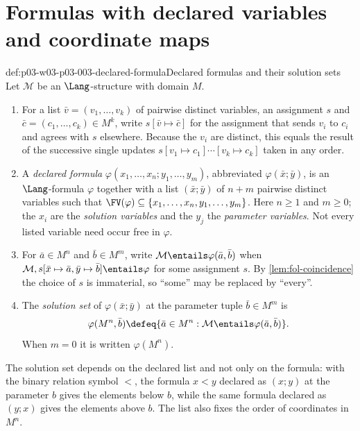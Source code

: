 \section{Formulas with declared variables and coordinate maps}
\label{sec:p03-w03-p03-003-declared}

\begin{hbconvention}{def:p03-w03-p03-003-declared-formula}{Declared formulas and their solution sets}
Let \(\mathcal M\) be an \(\Lang\)-structure with domain \(M\).
\begin{enumerate}
 \item For a list \(\bar v=(v_1,\ldots,v_k)\) of pairwise distinct variables,
       an assignment \(s\) and \(\bar c=(c_1,\ldots,c_k)\in M^k\), write
       \(s[\bar v\mapsto\bar c]\) for the assignment that sends \(v_i\) to
       \(c_i\) and agrees with \(s\) elsewhere.  Because the \(v_i\) are
       distinct, this equals the result of the successive single updates
       \(s[v_1\mapsto c_1]\cdots[v_k\mapsto c_k]\) taken in any order.
 \item A \emph{declared formula} \(\varphi(x_1,\ldots,x_n;y_1,\ldots,y_m)\),
       abbreviated \(\varphi(\bar x;\bar y)\), is an \(\Lang\)-formula
       \(\varphi\) together with a list \((\bar x;\bar y)\) of \(n+m\)
       pairwise distinct variables such that
       \(\FV(\varphi)\subseteq\{x_1,\ldots,x_n,y_1,\ldots,y_m\}\).  Here
       \(n\geq1\) and \(m\geq0\); the \(x_i\) are the \emph{solution
       variables} and the \(y_j\) the \emph{parameter variables}.  Not every
       listed variable need occur free in \(\varphi\).
 \item For \(\bar a\in M^n\) and \(\bar b\in M^m\), write
       \(\mathcal M\entails\varphi(\bar a,\bar b)\) when
       \(\mathcal M,s[\bar x\mapsto\bar a,\bar y\mapsto\bar b]\entails\varphi\)
       for some assignment \(s\).  By \cref{lem:fol-coincidence} the choice
       of \(s\) is immaterial, so ``some'' may be replaced by ``every''.
 \item The \emph{solution set} of \(\varphi(\bar x;\bar y)\) at the parameter
       tuple \(\bar b\in M^m\) is
       \[
        \varphi(M^n,\bar b)
        \defeq\{\bar a\in M^n:\mathcal M\entails\varphi(\bar a,\bar b)\}.
       \]
       When \(m=0\) it is written \(\varphi(M^n)\).
\end{enumerate}
The solution set depends on the declared list and not only on the formula:
with the binary relation symbol \(<\), the formula \(x<y\) declared as
\((x;y)\) at the parameter \(b\) gives the elements below \(b\), while the
same formula declared as \((y;x)\) gives the elements above \(b\).  The list
also fixes the order of coordinates in \(M^n\).
\end{hbconvention}

